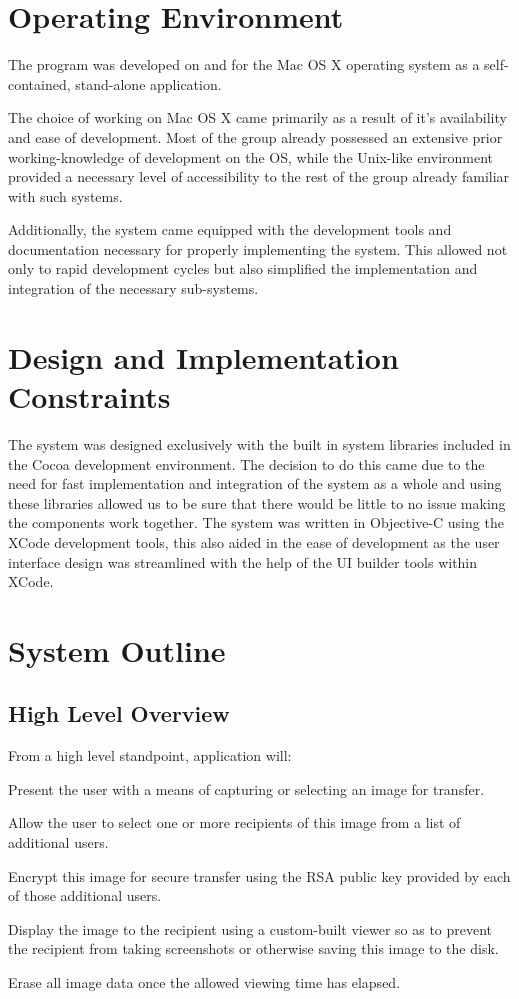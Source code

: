 \documentclass[11pt, a4paper,titlepage]{report}
\begin{document}
\section{Operating Environment}
The program was developed on and for the Mac OS X operating system as a self-contained, stand-alone application.

The choice of working on Mac OS X came primarily as a result of it's availability and ease of development. Most of the group already possessed an extensive prior working-knowledge of development on the OS, while the Unix-like environment provided a necessary level of accessibility to the rest of the group already familiar with such systems.

Additionally, the system came equipped with the development  tools and documentation necessary for properly implementing the system. This allowed not only to rapid development cycles but also simplified the implementation and integration of the necessary sub-systems.

\section{Design and Implementation Constraints}
The system was designed exclusively with the built in system libraries included in the Cocoa development environment. The decision to do this came due to the need for fast implementation and integration of the system as a whole and using these libraries allowed us to be sure that there would be little to no issue making the components work together. The system was written in Objective-C using the XCode development tools, this also aided in the ease of development as the user interface design was streamlined with the help of the UI builder tools within XCode.

\section{System Outline}
\subsection*{High Level Overview}
From a high level standpoint, application will:
\begin{itemize*}
	\item {Present the user with a means of capturing or selecting an image for transfer.}
	\item {Allow the user to select one or more recipients of this image from a list of additional users.}
	\item {Encrypt this image for secure transfer using the RSA public key provided by each of those additional users.}
	\item {Display the image to the recipient using a custom-built viewer so as to prevent the recipient from taking screenshots or otherwise saving this image to the disk.}
	\item {Erase all image data once the allowed viewing time has elapsed.}
\end{itemize*} 
\end{document}
